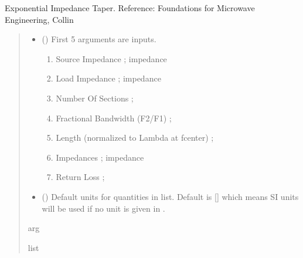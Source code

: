 \documentclass[letterpaper,10pt,english]{sphinxmanual}
\begin{document}
\begin{fulllineitems}
\label{\detokenize{components:components.Exponential_Taper_Impedance_Transformer}}
\pysigstartsignatures
{}
\pysigstopsignatures
\sphinxAtStartPar
Exponential Impedance Taper.
Reference:  Foundations for Microwave Engineering, Collin
\begin{quote}\begin{description}
\begin{itemize}
\item {}
\sphinxAtStartPar
{} () \textendash{}
\sphinxAtStartPar
First 5 arguments are inputs.
\begin{enumerate}
%
\item {}
\sphinxAtStartPar
Source Impedance ; impedance

\item {}
\sphinxAtStartPar
Load Impedance ; impedance

\item {}
\sphinxAtStartPar
Number Of Sections ;

\item {}
\sphinxAtStartPar
Fractional Bandwidth (F2/F1) ;

\item {}
\sphinxAtStartPar
Length (normalized to Lambda at fcenter) ;

\item {}
\sphinxAtStartPar
Impedances ; impedance

\item {}
\sphinxAtStartPar
Return Loss ;

\end{enumerate}


\item {}
\sphinxAtStartPar
{} (\sphinxstyleliteralemphasis{\sphinxupquote{, }}) \textendash{} Default units for quantities in  list. Default is {[}{]} which means SI units will be used if no unit is given in .

\end{itemize}

\sphinxAtStartPar
arg

\sphinxAtStartPar
list

\end{description}\end{quote}

\end{fulllineitems}
\end{document}
